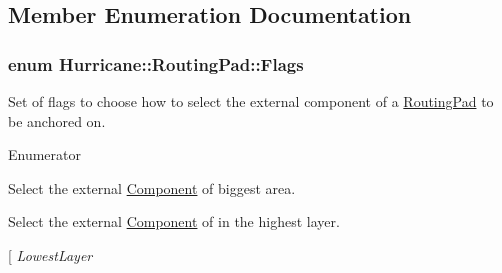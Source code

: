 \subsection{Member Enumeration Documentation}
\hypertarget{classHurricane_1_1RoutingPad_a69f37f0b06b9bfd758d9be42c71e2bd4}{
\subsubsection[{Flags}]{\setlength{\rightskip}{0pt plus 5cm}enum {\bf Hurricane\-::\-Routing\-Pad\-::\-Flags}}}\label{classHurricane_1_1RoutingPad_a69f37f0b06b9bfd758d9be42c71e2bd4}
Set of flags to choose how to select the external component of a \hyperlink{classHurricane_1_1RoutingPad}{Routing\-Pad} to be anchored on. \begin{Desc}
\item[Enumerator]\par
\begin{description}
\item[{\em 
\hypertarget{classHurricane_1_1RoutingPad_a69f37f0b06b9bfd758d9be42c71e2bd4add72642d150e901835fa7d66d40e327d}{Biggest\-Area}\label{classHurricane_1_1RoutingPad_a69f37f0b06b9bfd758d9be42c71e2bd4add72642d150e901835fa7d66d40e327d}
}]Select the external \hyperlink{classHurricane_1_1Component}{Component} of biggest area. \item[{\em 
\hypertarget{classHurricane_1_1RoutingPad_a69f37f0b06b9bfd758d9be42c71e2bd4a8f7993760a105713a97abdfb05eee852}{Highest\-Layer}\label{classHurricane_1_1RoutingPad_a69f37f0b06b9bfd758d9be42c71e2bd4a8f7993760a105713a97abdfb05eee852}
}]Select the external \hyperlink{classHurricane_1_1Component}{Component} of in the highest layer. \item[{\em 
\hypertarget{classHurricane_1_1RoutingPad_a69f37f0b06b9bfd758d9be42c71e2bd4a14c89f0c4ca6f4108b7f2ac30ab885a6}{Lowest\-Layer}\label{classHurricane_1_1RoutingPad_a69f37f0b06b9bfd758d9be42c71e2bd4a14c89f0c4ca6f4108b7f2ac30ab885a6}
}
\end{description}
\end{Desc}
